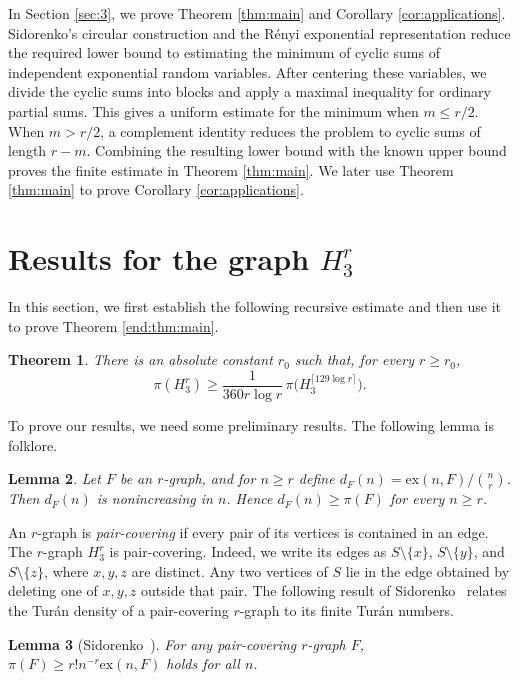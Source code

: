\documentclass[10pt,a4paper]{amsart}
\numberwithin{equation}{section}
\newtheorem{theorem}{Theorem}[section]
\newtheorem{lemma}[theorem]{Lemma}
\begin{document}
In Section \ref{sec:3}, we prove Theorem \ref{thm:main} and Corollary \ref{cor:applications}.  
Sidorenko's circular construction and the R\'enyi exponential representation reduce the required lower bound to estimating the minimum of cyclic sums of independent exponential random variables.  
After centering these variables, we divide the cyclic sums into blocks and apply a maximal inequality for ordinary partial sums.  
This gives a uniform estimate for the minimum when $m\le r/2$.  When $m>r/2$, a complement identity reduces the problem to cyclic sums of length $r-m$.  Combining the resulting lower bound with the known upper bound proves the finite estimate in Theorem \ref{thm:main}. We later use Theorem \ref{thm:main} to prove Corollary \ref{cor:applications}.




\section{Results for the graph \texorpdfstring{$H_3^r$}{H3r}}\label{sec:2}
In this section, we first establish the following recursive estimate and then use it to prove Theorem \ref{end:thm:main}.

\begin{theorem}\label{end:thm:recursion}
There is an absolute constant $r_0$ such that, for every $r\ge r_0$,
$$\pi(H_3^r)\ge \frac{1}{360r\log r}\,\pi\bigl(H_3^{\lceil 129\log r\rceil}\bigr).$$
\end{theorem}

To prove our results, we need some preliminary results. The following lemma is folklore. 

\begin{lemma}\label{end:lem:finite-density}
Let $F$ be an $r$-graph, and for $n\ge r$ define $d_F(n)=\mathrm{ex}(n,F)/\binom nr$.
Then $d_F(n)$ is nonincreasing in $n$.
Hence $d_F(n)\ge \pi(F)$ for every $n\ge r$.
\end{lemma}


An $r$-graph is \emph{pair-covering} if every pair of its vertices is contained in an edge.  
The $r$-graph $H_3^r$ is pair-covering.  
Indeed, we write its edges as $S\setminus\{x\}$, $S\setminus\{y\}$, and $S\setminus\{z\}$, where $x,y,z$ are distinct.  
Any two vertices of $S$ lie in the edge obtained by deleting one of $x,y,z$ outside that pair. The following result of Sidorenko~\cite{Sidorenko2024} relates the Tur\'an density of a pair-covering $r$-graph to its finite Tur\'an numbers.
\begin{lemma}[Sidorenko~\cite{Sidorenko2024}]\label{end:lem:blowup}
For any pair-covering $r$-graph $F$, 
$\pi(F)\ge r!n^{-r}\mathrm{ex}(n,F)$ holds for all $n$.
\end{lemma}
\end{document}

